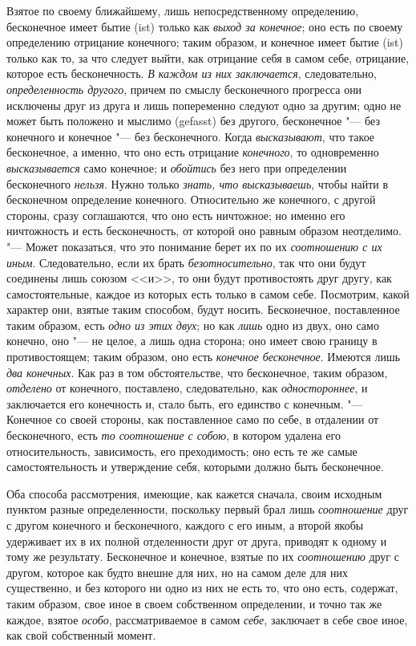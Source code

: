 Взятое по своему ближайшему, лишь непосредственному определению, бесконечное
имеет бытие (ist) только как {\em выход за конечное};
оно есть по своему определению отрицание конечного; таким образом, и
конечное имеет бытие (ist) только как то, за что следует выйти, как
отрицание себя в самом себе, отрицание, которое есть бесконечность.
{\em В каждом из них заключается}, следовательно,
{\em определенность другого}, причем по смыслу
бесконечного прогресса они исключены друг из друга и лишь попеременно
следуют одно за другим; одно не может быть положено и мыслимо (gefasst) без
другого, бесконечное "--- без конечного и конечное "--- без бесконечного. Когда
{\em высказывают}, что такое бесконечное, а именно, что
оно есть отрицание {\em конечного}, то одновременно
{\em высказывается} само конечное; и
{\em обойтись} без него при определении бесконечного
{\em нельзя}. Нужно только
{\em знать, что высказываешь}, чтобы найти в
бесконечном определение конечного. Относительно же конечного, с другой
стороны, сразу соглашаются, что оно есть ничтожное; но именно его
ничтожность и есть бесконечность, от которой оно равным образом неотделимо.
"--- Может показаться, что это понимание берет их по их
{\em соотношению с их иным}. Следовательно, если их
брать {\em безотносительно}, так что они будут
соединены лишь союзом <<и>>, то они будут противостоять друг другу, как
самостоятельные, каждое из которых есть только в самом себе. Посмотрим,
какой характер они, взятые таким способом, будут носить. Бесконечное,
поставленное таким образом, есть {\em одно из этих
двух}; но как {\em лишь} одно из двух, оно само
конечно, оно "--- не целое, а лишь одна сторона; оно имеет свою границу в
противостоящем; таким образом, оно есть {\em конечное
бесконечное}. Имеются лишь {\em два конечных}. Как раз
в том обстоятельстве, что бесконечное, таким образом,
{\em отделено} от конечного, поставлено, следовательно,
как {\em одностороннее}, и заключается его конечность
и, стало быть, его единство с конечным. "--- Конечное со своей стороны, как
поставленное само по себе, в отдалении от бесконечного, есть
{\em то соотношение с собою}, в котором удалена его
относительность, зависимость, его преходимость; оно есть те же самые
самостоятельность и утверждение себя, которыми должно быть бесконечное.

Оба способа рассмотрения, имеющие, как кажется сначала, своим исходным
пунктом разные определенности, поскольку первый брал лишь
{\em соотношение} друг с другом конечного и
бесконечного, каждого с его иным, а второй якобы удерживает их в их
полной отделенности друг от друга, приводят к одному и тому же результату.
Бесконечное и конечное, взятые по их {\em соотношению}
друг с другом, которое как будто внешне для них, но на самом деле для них
существенно, и без которого ни одно из них не есть то, что оно есть,
содержат, таким образом, свое иное в своем собственном определении, и
точно так же каждое, взятое {\em особо},
рассматриваемое в самом {\em себе}, заключает в себе
свое иное, как свой собственный момент.

